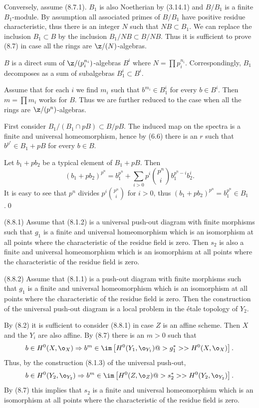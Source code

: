 Conversely, assume (8.7.1).
$B_1$ is also Noetherian by (3.14.1) and $B/B_1$ is  a finite
$B_1$-module. By assumption all associated primes of $B/B_1$ have positive
residue characteristic, thus there is an integer $N$ such that $NB\subset
B_1$. We can replace the inclusion $B_1\subset B$
by the inclusion $B_1/NB\subset B/NB$. Thus it is sufficient to prove (8.7) in
case all the rings are $\z/(N)$-algebras.

$B$ is a direct sum of $\z/(p_i^{n_i})$-algebras $B^i$ where
$N=\prod p_i^{n_i}$.  Correspondingly, $B_1$ decomposes as a sum of
subalgebras $B^i_1\subset B^i$.

Assume that for each $i$ we find $m_i$ such that
$b^{m_i}\in B^i_1$ for every $b\in B^i$. Then $m=\prod m_i$
works for $B$. Thus we are further reduced to the case when
all the rings are $\z/(p^n)$-algebras.

First consider   $B_1/(B_1\cap pB)\subset B/pB$. The induced map on
the spectra is a finite and
universal homeomorphism, hence by (6.6) there is an $r$ such that
$b^{p^r}\in B_1+pB$ for every $b\in B$.

Let $b_1+pb_2$ be a typical element of $B_1+pB$. Then
$$
(b_1+pb_2)^{p^n}=b_1^{p^n}+\sum_{i>0} p^i\binom{p^n}{i}b_1^{p^n-i}b_2^i.
$$
It is easy to see that $p^n$ divides $p^i\binom{p^n}{i}$ for $i>0$, thus
$(b_1+pb_2)^{p^n}=b_1^{p^n}\in B_1$.\qed\enddemo

 (8.8.1)  Assume that (8.1.2) is a universal
push-out diagram with finite morphisms such that  $g_1$ is a finite and
universal homeomorphism which is an isomorphism
at all points where the characteristic of the residue field is zero. Then $s_2$
is also a finite and universal
homeomorphism which is an isomorphism
at all points where the characteristic of the residue field is zero.

(8.8.2)  Assume that (8.1.1) is a  push-out
diagram with finite morphisms such that  $g_1$ is a finite and universal
homeomorphism which is an isomorphism
at all points where the characteristic of the residue field is zero.  Then the
construction of the universal push-out diagram is a local problem in the
\'etale topology of $Y_2$.
\endproclaim

\demop  By (8.2) it is sufficient to consider (8.8.1) in  case  $Z$ is an
affine scheme.  Then $X$ and the $Y_i$ are also affine. By (8.7) there is an
$m>0$ such that
$$
b\in H^0(X,\o_X)\Rightarrow b^m\in \im\left[H^0(Y_1,\o_{Y_1})@>g_1^*>>
H^0(X,\o_X)\right].
$$
Thus, by the construction (8.1.3) of the universal push-out,
$$
b\in H^0(Y_2,\o_{Y_2})\Rightarrow b^m\in \im\left[H^0(Z,\o_{Z})@>s_2^*>>
H^0(Y_2,\o_{Y_2})\right].
$$
By (8.7) this implies that $s_2$ is   a finite and universal
homeomorphism which is an isomorphism
at all points where the characteristic of the residue field is zero.



